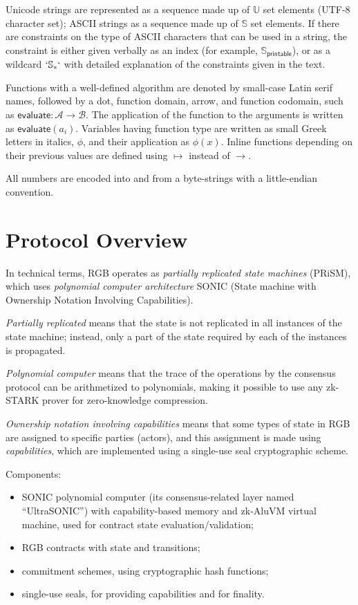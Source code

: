 \documentclass[a4paper]{article}
\begin{document}
\begin{multicols}{2}
Unicode strings are represented as a sequence made up of $\mathbb{U}$ set elements
(UTF-8 character set); ASCII strings as a sequence made up of $\mathbb{S}$ set elements.
If there are constraints on the type of ASCII characters that can be used in a string,
the constraint is either given verbally as an index (for example, $\mathbb{S}_\mathsf{printable}$),
or as a wildcard $`\mathbb{S}_*`$ with detailed explanation of the constraints given in the text.

Functions with a well-defined algorithm are denoted by small-case Latin serif names,
followed by a dot, function domain, arrow, and function codomain,
such as $\mathsf{evaluate}: \mathcal{A} \rightarrow \mathcal{B}$.
The application of the function to the arguments is written as $\mathsf{evaluate}(a_i)$.
Variables having function type are written as small Greek letters in italics, $\phi$,
and their application as $\phi(x)$.
Inline functions depending on their previous values are defined using
$\mapsto$ instead of $\rightarrow$.

All numbers are encoded into and from a byte-strings with a little-endian convention.

\section{Protocol Overview}

In technical terms, RGB operates as \emph{partially replicated state machines} (PRiSM),
which uses \emph{polynomial computer architecture} SONIC
(State machine with Ownership Notation Involving Capabilities).

\emph{Partially replicated} means that the state is not replicated in all instances
of the state machine; instead, only a part of the state required by each of the instances
is propagated.

\emph{Polynomial computer} means that the trace of the operations by the consensus protocol
can be arithmetized to polynomials,
making it possible to use any zk-STARK prover for zero-knowledge compression.

\emph{Ownership notation involving capabilities} means that some types of state in RGB
are assigned to specific parties (actors), and this assignment is made using \emph{capabilities},
which are implemented using a single-use seal cryptographic scheme.

Components:
\begin{itemize}
  \item SONIC polynomial computer (its consensus-related layer named ``UltraSONIC'')
  with capability-based memory and zk-AluVM virtual machine,
  used for contract state evaluation/validation;
  \item RGB contracts with state and transitions;
  \item commitment schemes, using cryptographic hash functions;
  \item single-use seals, for providing capabilities and for finality.
\end{itemize}


\end{multicols}
\end{document}
